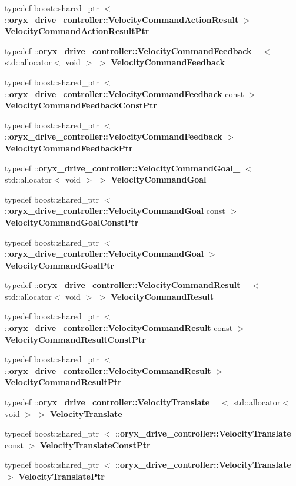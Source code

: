 \begin{DoxyCompactItemize}
typedef boost\-::shared\-\_\-ptr\*
$<$ \-::{\bf oryx\-\_\-drive\-\_\-controller\-::\-Velocity\-Command\-Action\-Result} $>$ {\bf \-Velocity\-Command\-Action\-Result\-Ptr}
\item 
typedef \*
\-::{\bf oryx\-\_\-drive\-\_\-controller\-::\-Velocity\-Command\-Feedback\-\_\-}\*
$<$ std\-::allocator$<$ void $>$ $>$ {\bf \-Velocity\-Command\-Feedback}
\item 
typedef boost\-::shared\-\_\-ptr\*
$<$ \-::{\bf oryx\-\_\-drive\-\_\-controller\-::\-Velocity\-Command\-Feedback} \*
const  $>$ {\bf \-Velocity\-Command\-Feedback\-Const\-Ptr}
\item 
typedef boost\-::shared\-\_\-ptr\*
$<$ \-::{\bf oryx\-\_\-drive\-\_\-controller\-::\-Velocity\-Command\-Feedback} $>$ {\bf \-Velocity\-Command\-Feedback\-Ptr}
\item 
typedef \*
\-::{\bf oryx\-\_\-drive\-\_\-controller\-::\-Velocity\-Command\-Goal\-\_\-}\*
$<$ std\-::allocator$<$ void $>$ $>$ {\bf \-Velocity\-Command\-Goal}
\item 
typedef boost\-::shared\-\_\-ptr\*
$<$ \-::{\bf oryx\-\_\-drive\-\_\-controller\-::\-Velocity\-Command\-Goal} \*
const  $>$ {\bf \-Velocity\-Command\-Goal\-Const\-Ptr}
\item 
typedef boost\-::shared\-\_\-ptr\*
$<$ \-::{\bf oryx\-\_\-drive\-\_\-controller\-::\-Velocity\-Command\-Goal} $>$ {\bf \-Velocity\-Command\-Goal\-Ptr}
\item 
typedef \*
\-::{\bf oryx\-\_\-drive\-\_\-controller\-::\-Velocity\-Command\-Result\-\_\-}\*
$<$ std\-::allocator$<$ void $>$ $>$ {\bf \-Velocity\-Command\-Result}
\item 
typedef boost\-::shared\-\_\-ptr\*
$<$ \-::{\bf oryx\-\_\-drive\-\_\-controller\-::\-Velocity\-Command\-Result} \*
const  $>$ {\bf \-Velocity\-Command\-Result\-Const\-Ptr}
\item 
typedef boost\-::shared\-\_\-ptr\*
$<$ \-::{\bf oryx\-\_\-drive\-\_\-controller\-::\-Velocity\-Command\-Result} $>$ {\bf \-Velocity\-Command\-Result\-Ptr}
\item 
typedef \*
\-::{\bf oryx\-\_\-drive\-\_\-controller\-::\-Velocity\-Translate\-\_\-}\*
$<$ std\-::allocator$<$ void $>$ $>$ {\bf \-Velocity\-Translate}
\item 
typedef boost\-::shared\-\_\-ptr\*
$<$ \-::{\bf oryx\-\_\-drive\-\_\-controller\-::\-Velocity\-Translate} \*
const  $>$ {\bf \-Velocity\-Translate\-Const\-Ptr}
\item 
typedef boost\-::shared\-\_\-ptr\*
$<$ \-::{\bf oryx\-\_\-drive\-\_\-controller\-::\-Velocity\-Translate} $>$ {\bf \-Velocity\-Translate\-Ptr}
\end{DoxyCompactItemize}
